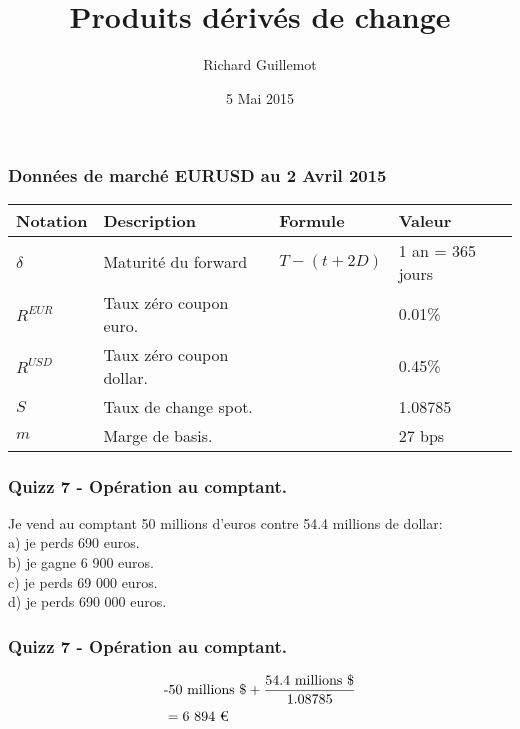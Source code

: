 \documentclass{beamer}
\title[Produits dérivés de change et de credit]{Produits dérivés de change}
\author{Richard Guillemot}
\institute{DIFIQ}
\date{5 Mai 2015}
\begin{document}
\begin{frame}
\titlepage
\end{frame}

\begin{frame}
\small
\frametitle{Données de marché EURUSD au 2 Avril 2015}
\begin{center}
\begin{tabular}{|l|l|l|l|}
\hline
\textbf{Notation} & \textbf{Description} & \textbf{Formule} & \textbf{Valeur} \\
\hline
\hline
$\delta$ & Maturité du forward & $T-(t+2D)$ & 1 an = 365 jours \\
$R^{EUR}$ & Taux zéro coupon euro. &  & 0.01\% \\
$R^{USD}$ & Taux zéro coupon dollar. &  & 0.45\% \\
$S$ & Taux de change spot. &  & 1.08785 \\
$m$ & Marge de basis. &  & 27 bps \\
\hline
\end{tabular}
\end{center}
\end{frame}

\begin{frame}
\frametitle{Quizz 7 - Opération au comptant.}
Je vend au comptant 50 millions d'euros contre 54.4 millions de dollar: \\
\vspace{0.5cm}
a) je perds 690 euros. \\
b) je gagne 6 900 euros.  \\
c) je perds 69 000 euros. \\
d) je perds 690 000 euros.  \\
\vspace{0.5cm}
\end{frame}

\begin{frame}
\frametitle{Quizz 7 - Opération au comptant.}
\huge
\[
\begin{split}
&\text{-50 millions \$}+\frac{\text{54.4 millions \$}}{1.08785}\\
&=\text{6 894 \texteuro}\\
\end{split}
\]
\end{frame}
\end{document}
